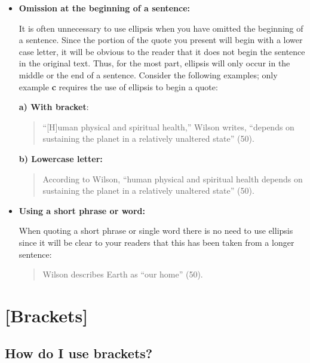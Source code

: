 \begin{itemize} \item\textbf{Omission at the beginning of a sentence:}

It is often unnecessary to use ellipsis when you have omitted the beginning of a
sentence. Since the portion of the quote you present will begin with a lower
case letter, it will be obvious to the reader that it does not begin the
sentence in the original text. Thus, for the most part, ellipsis will only occur
in the middle or the end of a sentence. Consider the following examples; only
example \textbf{c} requires the use of ellipsis to begin a quote:

\textbf{a) With bracket}:  \begin{quote}“[H]uman physical and spiritual health,”
Wilson writes, “depends on sustaining the planet in a relatively unaltered
state” (50).\end{quote}

\textbf{b) Lowercase letter:} \begin{quote}According to Wilson, “human physical
and spiritual health depends on sustaining the planet in a relatively unaltered
state” (50).\end{quote}



\item \textbf{Using a short phrase or word:}

When quoting a short phrase or single word there is no need to use ellipsis
since it will be clear to your readers that this has been taken from a longer
sentence:

\begin{quote} Wilson describes Earth as “our home” (50).\end{quote}

\end{itemize}

\hypertarget{brackets}{}
\section{[Brackets]} \subsection{How do I use brackets?}

